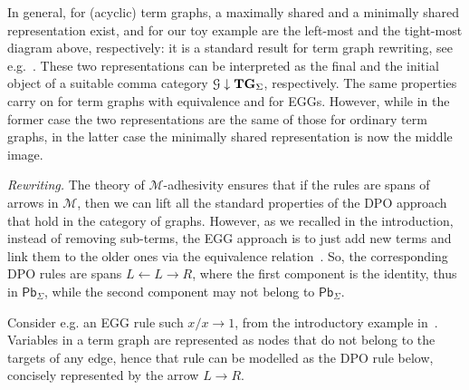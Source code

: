 \documentclass[a4paper,UKenglish,cleveref,pdftex,thm-restate,numberwithinsect]{lipics-v2021}
\newcommand{\pbc}{\mathsf{Pb}}
\newcommand{\eg}[0]{\mathbf{EGG}}
\newcommand{\catname}[1]{\textbf{\textup{#1}}}
\newcommand{\GEqTGs}{\catname{GEqTG}_{\Sigma}}
\newcommand{\tg}[0]{\catname{TG}_{\Sigma}}
\begin{document}
In general, for (acyclic) term graphs, a maximally shared and a minimally shared representation
exist, and for our toy example are the left-most and the tight-most diagram above, respectively:
it is a standard result for term graph rewriting, see e.g.~\cite{AriolaKP00}. 
These two representations can be interpreted as the final and the initial object of a suitable comma category 
$\mathcal{G}  \downarrow \tg$, respectively.
%
The same properties carry on 
%
for term graphs with equivalence and for EGGs. However, while in the former case the
two representations are the same of those for ordinary term graphs, in the latter case
the minimally shared representation is now the middle image.
%

\emph{Rewriting.} The theory of $\mathcal{M}$-adhesivity ensures that if the rules are spans of 
arrows in $\mathcal{M}$, then we can lift all the standard properties
of the DPO approach that hold in the category of graphs.
However, as we recalled in the introduction, instead of removing sub-terms, the EGG approach is to
just add new terms and link them to the older ones via the equivalence relation~\cite{DetlefsNS05}.
So, the corresponding DPO rules 
are spans $L \leftarrow L \rightarrow R$, where the first component is the identity, thus in $\pbc_\Sigma$,
while the second component may not belong to $\pbc_\Sigma$. 

Consider e.g. an EGG rule such $x / x \to 1$, from the introductory example in~\cite{WillseyNWFTP21}.
Variables in a term graph are represented as nodes that do not belong to the targets of any edge, 
hence that rule can be modelled as the DPO rule below, concisely represented by the arrow $L \rightarrow R$.
\end{document}
